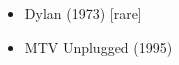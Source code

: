 \documentclass[twocolumn]{article}
\begin{document}
\begin{itemize}

\item Dylan (1973) [rare]
\item MTV Unplugged (1995)

\end{itemize}
\end{document}
